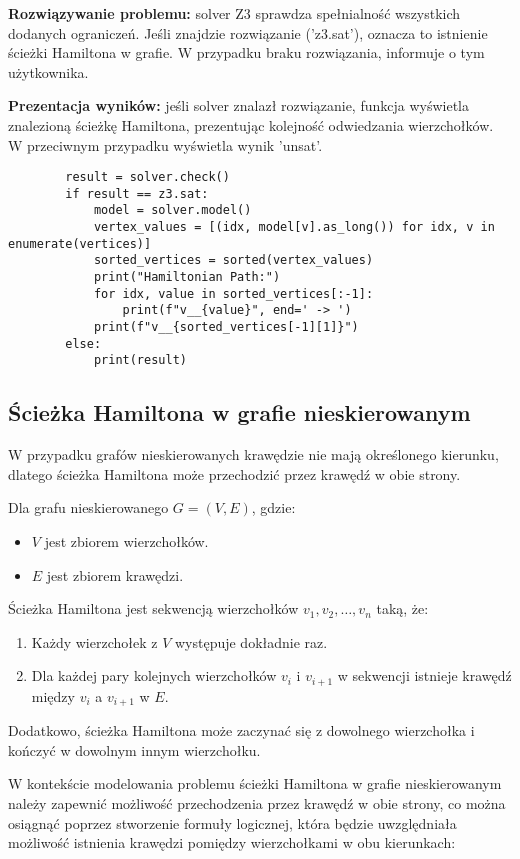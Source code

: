\textbf{Rozwiązywanie problemu: } solver Z3 sprawdza spełnialność wszystkich dodanych ograniczeń. Jeśli znajdzie rozwiązanie ('z3.sat'), oznacza to istnienie ścieżki Hamiltona w grafie. W przypadku braku rozwiązania, informuje o tym użytkownika.

\textbf{Prezentacja wyników: } jeśli solver znalazł rozwiązanie, funkcja wyświetla znalezioną ścieżkę Hamiltona, prezentując kolejność odwiedzania wierzchołków. W przeciwnym przypadku wyświetla wynik 'unsat'.

\begin{lstlisting}
		result = solver.check()
		if result == z3.sat:
			model = solver.model()
			vertex_values = [(idx, model[v].as_long()) for idx, v in enumerate(vertices)]
			sorted_vertices = sorted(vertex_values)
			print("Hamiltonian Path:")
			for idx, value in sorted_vertices[:-1]:
				print(f"v__{value}", end=' -> ')
			print(f"v__{sorted_vertices[-1][1]}")
		else:
			print(result)
\end{lstlisting}


\subsection{Ścieżka Hamiltona w grafie nieskierowanym}

W przypadku grafów nieskierowanych krawędzie nie mają określonego kierunku, dlatego ścieżka Hamiltona może przechodzić przez krawędź w obie strony. 

Dla grafu nieskierowanego $G = (V, E)$, gdzie:
\begin{itemize}
	\item \(V\) jest zbiorem wierzchołków.
	\item \(E\) jest zbiorem krawędzi.
\end{itemize}
Ścieżka Hamiltona jest sekwencją wierzchołków $v_1, v_2, …, v_n$ taką, że:
\begin{enumerate}
	\item Każdy wierzchołek z \(V\) występuje dokładnie raz.
	\item Dla każdej pary kolejnych wierzchołków \(v_i\) i \(v_{i+1}\) w sekwencji istnieje krawędź między \(v_i\) a \(v_{i+1}\) w \(E\). 
\end{enumerate}

Dodatkowo, ścieżka Hamiltona może zaczynać się z dowolnego wierzchołka i kończyć w dowolnym innym wierzchołku.

W kontekście modelowania problemu ścieżki Hamiltona w grafie nieskierowanym należy zapewnić możliwość przechodzenia przez krawędź w obie strony, co można osiągnąć poprzez stworzenie formuły logicznej, która będzie uwzględniała możliwość istnienia krawędzi pomiędzy wierzchołkami w obu kierunkach:

